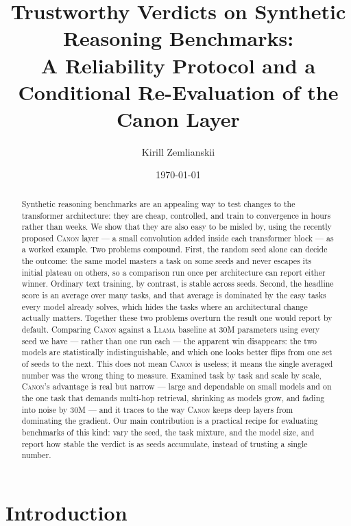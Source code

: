 \documentclass{article}
\title{Trustworthy Verdicts on Synthetic Reasoning Benchmarks:\\
A Reliability Protocol and a Conditional Re-Evaluation of the Canon Layer}
\author{Kirill Zemlianskii}
\date{\today}
\newcommand{\Canon}{\textsc{Canon}\xspace}
\newcommand{\Llama}{\textsc{Llama}\xspace}
\begin{document}
\maketitle

\begin{abstract}
Synthetic reasoning benchmarks are an appealing way to test changes to the transformer
architecture: they are cheap, controlled, and train to convergence in hours rather than weeks.
We show that they are also easy to be misled by, using the recently proposed \Canon layer ---
a small convolution added inside each transformer block --- as a worked example. Two problems
compound. First, the random seed alone can decide the outcome: the same model masters a task
on some seeds and never escapes its initial plateau on others, so a comparison run once per
architecture can report either winner. Ordinary text training, by contrast, is stable across
seeds. Second, the headline score is an average over many tasks, and that average is dominated
by the easy tasks every model already solves, which hides the tasks where an architectural
change actually matters. Together these two problems overturn the result one would report by
default. Comparing \Canon against a \Llama baseline at 30M parameters using every seed we have
--- rather than one run each --- the apparent win disappears: the two models are statistically
indistinguishable, and which one looks better flips from one set of seeds to the next. This
does not mean \Canon is useless; it means the single averaged number was the wrong thing to
measure. Examined task by task and scale by scale, \Canon's advantage is real but narrow ---
large and dependable on small models and on the one task that demands multi-hop retrieval,
shrinking as models grow, and fading into noise by 30M --- and it traces to the way \Canon
keeps deep layers from dominating the gradient. Our main contribution is a practical recipe
for evaluating benchmarks of this kind: vary the seed, the task mixture, and the model size,
and report how stable the verdict is as seeds accumulate, instead of trusting a single number.
\end{abstract}

\section{Introduction}
\label{sec:intro}
\end{document}
